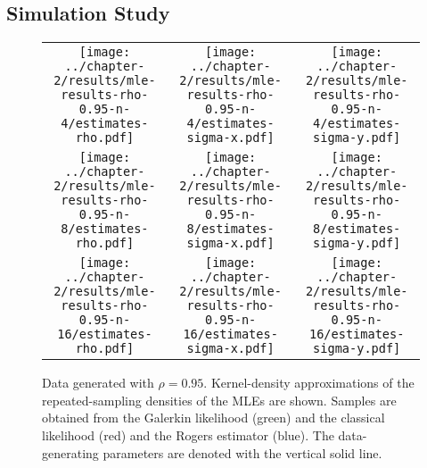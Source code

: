 \subsection{Simulation Study} \label{sec:simulation-study}
\begin{figure}
  \centering
  \begin{tabular}{ccc}
    \begin{minipage}{0.3\textwidth}
      \centering
      \texttt{[image: ../chapter-2/results/mle-results-rho-0.95-n-4/estimates-rho.pdf]}
    \end{minipage}
    & \begin{minipage}{0.3\textwidth}
      \centering
      \texttt{[image: ../chapter-2/results/mle-results-rho-0.95-n-4/estimates-sigma-x.pdf]}
    \end{minipage}
    & \begin{minipage}{0.3\textwidth}
      \centering
      \texttt{[image: ../chapter-2/results/mle-results-rho-0.95-n-4/estimates-sigma-y.pdf]}
    \end{minipage} \\
    \begin{minipage}{0.3\textwidth}
      \centering
      \texttt{[image: ../chapter-2/results/mle-results-rho-0.95-n-8/estimates-rho.pdf]}
    \end{minipage}
    & \begin{minipage}{0.3\textwidth}
      \centering
      \texttt{[image: ../chapter-2/results/mle-results-rho-0.95-n-8/estimates-sigma-x.pdf]}
    \end{minipage}
    & \begin{minipage}{0.3\textwidth}
      \centering
      \texttt{[image: ../chapter-2/results/mle-results-rho-0.95-n-8/estimates-sigma-y.pdf]}
    \end{minipage} \\
    \begin{minipage}{0.3\textwidth}
      \centering
      \texttt{[image: ../chapter-2/results/mle-results-rho-0.95-n-16/estimates-rho.pdf]}
    \end{minipage}
    & \begin{minipage}{0.3\textwidth}
      \centering
      \texttt{[image: ../chapter-2/results/mle-results-rho-0.95-n-16/estimates-sigma-x.pdf]}
    \end{minipage}
    & \begin{minipage}{0.3\textwidth}
      \centering
      \texttt{[image: ../chapter-2/results/mle-results-rho-0.95-n-16/estimates-sigma-y.pdf]}
    \end{minipage}
  \end{tabular}
  \caption{Data generated with $\rho=0.95$. Kernel-density
    approximations of the repeated-sampling densities of the MLEs are
    shown.  Samples are obtained from the Galerkin likelihood (green)
    and the classical likelihood (red) and the Rogers estimator
    (blue). The data-generating parameters are denoted with the
    vertical solid line.}
  \label{fig:mle-comparison-rho-0.95}
\end{figure}


